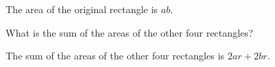 
The area of the original rectangle is $ab.$

What is the sum of the areas of the other four rectangles?





















The sum of the areas of the other four rectangles is $2ar + 2br.$

